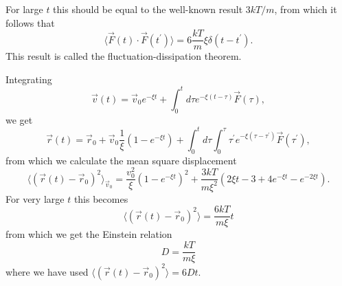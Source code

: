 For large $t$ this should be equal to the well-known result $3kT/m$, from which it follows that
\[
\langle \vec{F}(t)\cdot \vec{F}(t^{\prime })\rangle =6\frac{kT}{m}\xi \delta (t-t^{\prime }). \]
This result is called the fluctuation-dissipation theorem.

Integrating 
 \[ 
\vec{v}(t)=\vec{v}_{0}e^{-\xi t}+\int_{0}^{t}d\tau e^{-\xi (t-\tau )}\vec{F }(\tau ), \] 
we get
\[
\vec{r}(t)=\vec{r}_{0}+\vec{v}_{0}\frac{1}{\xi }(1-e^{-\xi t})+
\int_0^td\tau \int_0^{\tau}\tau ^{\prime } e^{-\xi (\tau -\tau ^{\prime })}\vec{F}(\tau ^{\prime }), \]
from which we calculate the mean square displacement 
\[
\langle ( \vec{r}(t)-\vec{r}_{0})^{2}\rangle _{\vec{v}_{0}}=\frac{v_0^2}{\xi}(1-e^{-\xi t})^{2}+\frac{3kT}{m\xi ^{2}}(2\xi t-3+4e^{-\xi t}-e^{-2\xi t}). \]
For very large $t$ this becomes
\[
\langle (\vec{r}(t)-\vec{r}_{0})^{2}\rangle =\frac{6kT}{m\xi }t \] 
from which we get the Einstein relation  
 \[ D= \frac{kT}{m\xi } \] 	
where we have used $\langle (\vec{r}(t)-\vec{r}_{0})^{2}\rangle =6Dt$.


